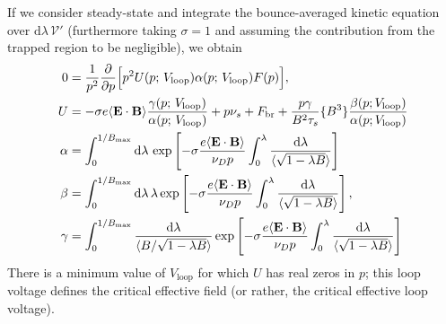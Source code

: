 \documentclass[11pt,a4paper]{article}
\newcommand{\rd}{\ensuremath{\mathrm{d}}}
\newcommand{\sub}[1]{\ensuremath{_{\text{#1}}}}
\renewcommand{\b}[1]{\ensuremath{ {\bf #1 } }}
\begin{document}
If we consider steady-state and integrate the bounce-averaged kinetic equation over $\rd \lambda \,\mathcal{V}'$ (furthermore taking $\sigma=1$ and assuming the contribution from the trapped region to be negligible), we obtain 
\begin{align}
0 &= \frac{1}{p^2}\frac{\partial }{\partial p}\Big[p^2 U(p; \,V\sub{loop}) \alpha(p;\,V\sub{loop}) F(p)\Big], \nonumber \\
U &=-\sigma  e\langle\b{E}\cdot\b{B}\rangle\frac{\gamma(p;\,V\sub{loop})}{\alpha(p;\,V\sub{loop})}+ p\nu_s + F\sub{br}+ \frac{p\gamma}{B^2\tau_s}\{B^3 \}\frac{\beta(p; V\sub{loop})}{\alpha(p;V\sub{loop})} \nonumber \\
\alpha &=  \int_0^{1/B\sub{max}}\rd \lambda \,  \exp\left[- \sigma\frac{e\langle \b{E}\cdot\b{B}\rangle}{\nu_D p}\int_0^\lambda\frac{\rd \lambda}{\langle\sqrt{1-\lambda B}\rangle}\right] \nonumber \\
\beta &= \int_0^{1/B\sub{max}}\rd \lambda \,\lambda\exp\left[- \sigma\frac{e\langle \b{E}\cdot\b{B}\rangle}{\nu_D p}\int_0^\lambda\frac{\rd \lambda}{\langle\sqrt{1-\lambda B}\rangle}\right] \nonumber, \\
\gamma &= \int_0^{1/B\sub{max}}   \frac{\rd \lambda}{\langle B/\sqrt{1-\lambda B}\rangle}\exp\left[- \sigma\frac{e\langle \b{E}\cdot\b{B}\rangle}{\nu_D p}\int_0^\lambda\frac{\rd \lambda}{\langle\sqrt{1-\lambda B}\rangle}\right] 
\end{align}
There is a minimum value of $V\sub{loop}$ for which $U$ has real zeros in $p$; this loop voltage defines the critical effective field (or rather, the critical effective loop voltage).
\end{document}
